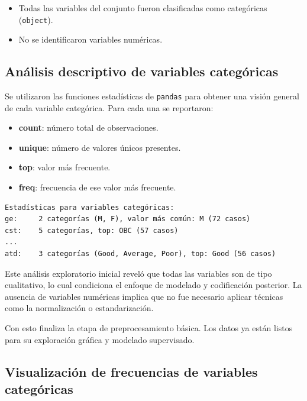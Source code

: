 \documentclass[11pt,a4paper]{article}
\begin{document}
\begin{itemize}
  \item Todas las variables del conjunto fueron clasificadas como categóricas (\texttt{object}).
  \item No se identificaron variables numéricas.
\end{itemize}

\medskip

\subsection{Análisis descriptivo de variables categóricas}

Se utilizaron las funciones estadísticas de \texttt{pandas} para obtener una visión general de cada variable categórica. Para cada una se reportaron:

\begin{itemize}
  \item \textbf{count}: número total de observaciones.
  \item \textbf{unique}: número de valores únicos presentes.
  \item \textbf{top}: valor más frecuente.
  \item \textbf{freq}: frecuencia de ese valor más frecuente.
\end{itemize}

\begin{verbatim}
Estadísticas para variables categóricas:
ge:     2 categorías (M, F), valor más común: M (72 casos)
cst:    5 categorías, top: OBC (57 casos)
...
atd:    3 categorías (Good, Average, Poor), top: Good (56 casos)
\end{verbatim}

\medskip

Este análisis exploratorio inicial reveló que todas las variables son de tipo cualitativo, lo cual condiciona el enfoque de modelado y codificación posterior. La ausencia de variables numéricas implica que no fue necesario aplicar técnicas como la normalización o estandarización.

\medskip

Con esto finaliza la etapa de preprocesamiento básica. Los datos ya están listos para su exploración gráfica y modelado supervisado.

\subsection{Visualización de frecuencias de variables categóricas}
\end{document}
